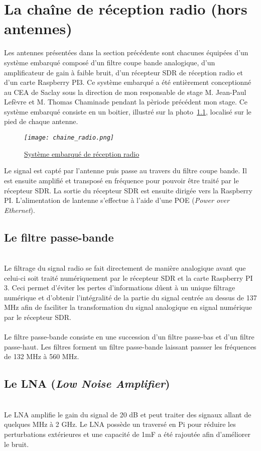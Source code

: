 \documentclass[12pt,fleqn]{book} %
\begin{document}
\chapter{La chaîne de réception radio (hors antennes)}
Les antennes présentées dans la section précédente sont chacunes équipées d'un système embarqué composé d'un filtre coupe bande analogique, d'un amplificateur de gain à faible bruit, d'un récepteur SDR de réception radio et d'un carte Raspberry PI3. Ce système embarqué a été entièrement conceptionné au CEA de Saclay sous la direction de mon responsable de stage M. Jean-Paul Lefèvre et M. Thomas Chaminade pendant la pèriode précédent mon stage.
Ce système embarqué consiste en un boitier, illustré sur la photo~\ref{boîtier}, localisé sur le pied de chaque antenne.
\begin{figure}[H]
	\centering
	\itshape
	\texttt{[image: chaine\_radio.png]}
	\caption{\label{boîtier} \underline{Système embarqué de réception radio}}
\end{figure}
Le signal est capté par l'antenne puis passe au travers du filtre coupe bande. Il est ensuite amplifié et transposé en fréquence pour pouvoir être traité par le récepteur SDR. La sortie du récepteur SDR est ensuite dirigée vers la Raspberry PI. L'alimentation de lantenne s'effectue à l'aide d'une POE (\emph{Power over Ethernet}).
\section{Le filtre passe-bande}
~\\\indent Le filtrage du signal radio se fait directement de manière analogique avant que celui-ci soit traité numériquement par le récepteur SDR et la carte Raspberry PI 3. Ceci permet d'éviter les pertes d'informations dûent à un unique filtrage numérique et d'obtenir l'intégralité de la partie du signal centrée au dessus de 137 MHz afin de faciliter la transformation du signal analogique en signal numérique par le récepteur SDR.
~\\\\Le filtre passe-bande consiste en une succession d'un filtre passe-bas et d'un filtre passe-haut. Les filtres forment un filtre passe-bande laissant passser les fréquences de 132 MHz à 560 MHz.
\section{Le LNA (\emph{Low Noise Amplifier})}
~\\\indent Le LNA amplifie le gain du signal de 20 dB et peut traiter des signaux allant de quelques MHz à 2 GHz. Le LNA possède un traversé en Pi pour réduire les perturbations extérieures et une capacité de 1mF a été rajoutée afin d’améliorer le bruit.
\end{document}
